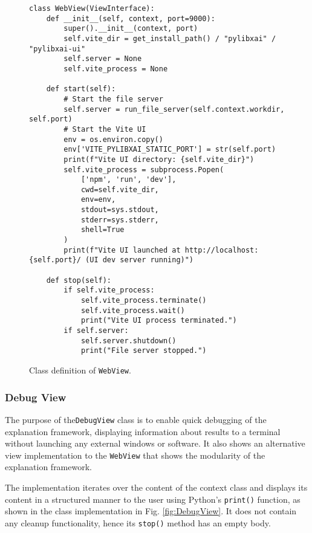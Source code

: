\documentclass[
    bindingoffset=5mm,  %
    footnoteindent=3mm, %
    hyphenation=true    %
]{src/wut-thesis}
\begin{document}
\begin{figure}%
\begin{verbatim}
class WebView(ViewInterface):
    def __init__(self, context, port=9000):
        super().__init__(context, port)
        self.vite_dir = get_install_path() / "pylibxai" / "pylibxai-ui"
        self.server = None
        self.vite_process = None

    def start(self):
        # Start the file server
        self.server = run_file_server(self.context.workdir, self.port)
        # Start the Vite UI
        env = os.environ.copy()
        env['VITE_PYLIBXAI_STATIC_PORT'] = str(self.port)
        print(f"Vite UI directory: {self.vite_dir}")
        self.vite_process = subprocess.Popen(
            ['npm', 'run', 'dev'],
            cwd=self.vite_dir,
            env=env,
            stdout=sys.stdout,
            stderr=sys.stderr,
            shell=True
        )
        print(f"Vite UI launched at http://localhost:{self.port}/ (UI dev server running)")

    def stop(self):
        if self.vite_process:
            self.vite_process.terminate()
            self.vite_process.wait()
            print("Vite UI process terminated.")
        if self.server:
            self.server.shutdown()
            print("File server stopped.")
\end{verbatim}
\caption{Class definition of \texttt{WebView}.}
\label{fig:WebView}
\end{figure}
 
\subsubsection{Debug View}

The purpose of the\texttt{DebugView} class is to enable quick debugging of the explanation
framework, displaying information about results to a terminal without launching any external windows or software.
It also shows an alternative view implementation to the \texttt{WebView} that shows the modularity of the explanation framework.

The implementation iterates over the content of the context class and displays its content in a structured manner to the user
using Python's \texttt{print()} function, as shown in the class implementation in Fig. \ref{fig:DebugView}. It does not contain any cleanup functionality, hence its \texttt{stop()} method has an empty body.
\end{document}
